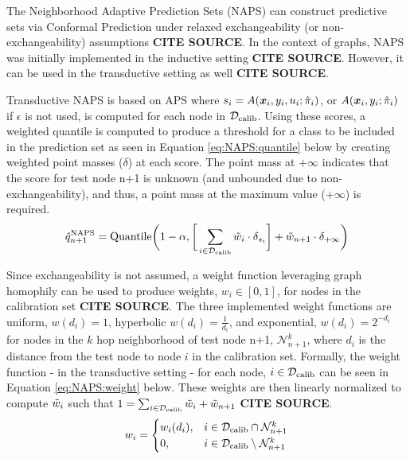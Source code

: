 The Neighborhood Adaptive Prediction Sets (NAPS) can construct predictive sets via Conformal Prediction under relaxed exchangeability (or non-exchangeability) assumptions \textbf{CITE SOURCE}. In the context of graphs, NAPS was initially implemented in the inductive setting \textbf{CITE SOURCE}. However, it can be used in the transductive setting as well \textbf{CITE SOURCE}. 


Transductive NAPS is based on APS where $s_i = A({\bm{x}}_i, y_i, u_i;\hat{\pi}_i)$, or $A({\bm{x}}_i, y_i;\hat{\pi}_i)$ if $\epsilon$ is not used, is computed for each node in ${\mathcal{D}}_{\text{calib}}$. Using these scores, a weighted quantile is computed to produce a threshold for a class to be included in the prediction set as seen in Equation \ref{eq:NAPS:quantile} below by creating weighted point masses ($\delta$) at each score. The point mass at $+\infty$ indicates that the score for test node n+1 is unknown (and unbounded due to non-exchangeability), and thus, a point mass at the maximum value ($+\infty$) is required. 
\begin{align}
    \hat{q}^{\text{NAPS}}_{n+1} = \text{Quantile}\bigg(1-\alpha, \bigg[\sum_{i\in{\mathcal{D}}_{\text{calib}}}\Tilde{w}_{i}\cdot \delta_{s_{i}}\bigg] + \Tilde{w}_{n+1}\cdot \delta_{+\infty}\bigg)
    \label{eq:NAPS:quantile}
\end{align}

Since exchangeability is not assumed, a weight function leveraging graph homophily can be used to produce weights, $w_i\in [0,1]$, for nodes in the calibration set \textbf{CITE SOURCE}. The three implemented weight functions are uniform, $w(d_i) = 1$, hyperbolic $w(d_i) = \frac{1}{d_i}$, and exponential, $w(d_i) = 2^{-d_i}$ for nodes in the $k$ hop neighborhood of test node n+1, $\mathcal{N}_{n+1}^k$, where $d_i$ is the distance from the test node to node $i$ in the calibration set. Formally, the weight function - in the transductive setting - for each node, $i\in{\mathcal{D}}_{\text{calib}}$ can be seen in Equation \ref{eq:NAPS:weight} below. These weights are then linearly normalized to compute $\Tilde{w}_i$ such that $1 = \sum_{i\in{\mathcal{D}}_{\text{calib}}} \Tilde{w}_i + \Tilde{w}_{n+1}$  \textbf{CITE SOURCE}.
\begin{align}
    w_i = \begin{cases}
w_i(d_i), & i\in {\mathcal{D}}_{\text{calib}}\cap\mathcal{N}_{n+1}^k\\
0,& i\in {\mathcal{D}}_{\text{calib}}\setminus\mathcal{N}_{n+1}^k
\end{cases}
    \label{eq:NAPS:weight}
\end{align}

